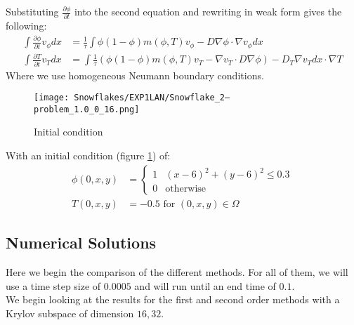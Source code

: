 Substituting $\frac{\partial \phi}{\partial t}$ into the second equation and rewriting in weak form gives the following:
\begin{align*}
    \int \frac{\partial \phi}{\partial t} v_{\phi}dx &=  \frac 1{\tau}\int \phi(1-\phi)m(\phi,T)v_{\phi} - D \nabla \phi \cdot \nabla v_{\phi}dx\\
    \int \frac{\partial T}{\partial t} v_T dx &= \int \frac 1{\tau}(\phi(1-\phi)m(\phi,T)v_T - \nabla v_T \cdot D \nabla \phi) - D_T \nabla v_Tdx \cdot \nabla T
\end{align*}
Where we use homogeneous Neumann boundary conditions.
\begin{figure}[H]
    \centering
    \texttt{[image: Snowflakes/EXP1LAN/Snowflake\_2--problem\_1.0\_0\_16.png]} %
    \caption{Initial condition}
    \label{fig:initial}
\end{figure}
With an initial condition (figure \ref{fig:initial}) of: 
\begin{align*}
    \phi(0,x,y) &= \begin{cases} 
      1 & (x - 6)^2 + (y - 6)^2 \leq 0.3 \\
      0 & \text{otherwise} \end{cases}\\
    T(0,x,y) &= -0.5 \text{  for  } (0,x,y)\in \Omega
\end{align*}

\subsection{Numerical Solutions}
Here we begin the comparison of the different methods.
For all of them, we will use a time step size of $0.0005$ and will run until an end time of $0.1$.\\

We begin looking at the results for the first and second order methods with a Krylov subspace of dimension $16, 32$.

